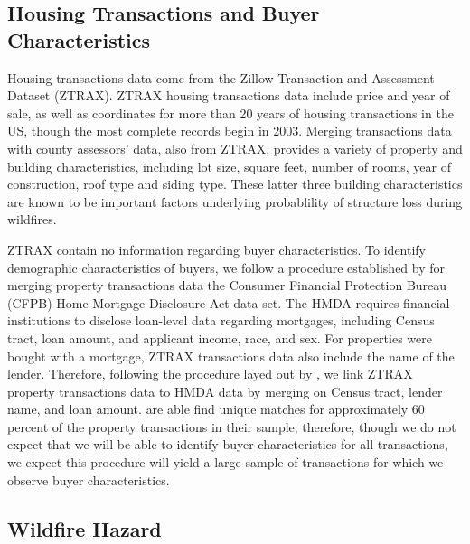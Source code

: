 \documentclass[10pt]{article}
\begin{document}
\subsection{Housing Transactions and Buyer Characteristics}

Housing transactions data come from the Zillow Transaction and Assessment Dataset (ZTRAX). ZTRAX housing transactions data include price and year of sale, as well as coordinates for more than 20 years of housing transactions in the US, though the most complete records begin in 2003. Merging transactions data with county assessors' data, also from ZTRAX, provides a variety of property and building characteristics, including lot size, square feet, number of rooms, year of construction, roof type and siding type. These latter three building characteristics are known to be important factors underlying probablility of structure loss during wildfires.

ZTRAX contain no information regarding buyer characteristics. To identify demographic characteristics of buyers, we follow a procedure established by \citet{bayer2007} for merging property transactions data the Consumer Financial Protection Bureau (CFPB) Home Mortgage Disclosure Act data set. The HMDA requires financial institutions to disclose loan-level data regarding mortgages, including Census tract, loan amount, and applicant income, race, and sex. For properties were bought with a mortgage, ZTRAX transactions data also include the name of the lender. Therefore, following the procedure layed out by \citet{bayer2007}, we link ZTRAX property transactions data to HMDA data by merging on Census tract, lender name, and loan amount. \citet{bayer2007} are able find unique matches for approximately 60 percent of the property transactions in their sample; therefore, though we do not expect that we will be able to identify buyer characteristics for all transactions, we expect this procedure will yield a large sample of transactions for which we observe buyer characteristics.

\subsection{Wildfire Hazard}





\end{document}
